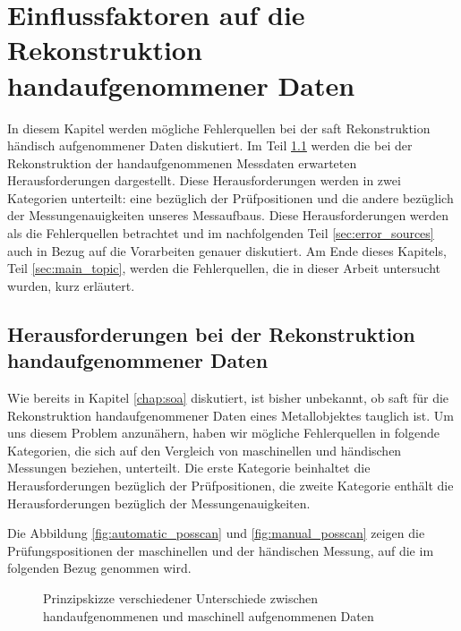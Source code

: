 
\chapter{Einflussfaktoren auf die Rekonstruktion handaufgenommener Daten} \label{chap:errorsource}
In diesem Kapitel werden mögliche Fehlerquellen bei der \acrshort{saft} Rekonstruktion händisch aufgenommener Daten diskutiert. Im Teil \ref{sec:challenges} werden die bei der Rekonstruktion der handaufgenommenen Messdaten erwarteten Herausforderungen dargestellt. Diese Herausforderungen werden in zwei Kategorien unterteilt: eine bezüglich der Prüfpositionen und die andere bezüglich der Messungenauigkeiten unseres Messaufbaus. Diese Herausforderungen werden als die Fehlerquellen betrachtet und im nachfolgenden Teil \ref{sec:error_sources} auch in Bezug auf die Vorarbeiten genauer diskutiert. Am Ende dieses Kapitels, Teil \ref{sec:main_topic}, werden die Fehlerquellen, die in dieser Arbeit untersucht wurden, kurz erläutert.


\section{Herausforderungen bei der Rekonstruktion handaufgenommener Daten} \label{sec:challenges}
Wie bereits in Kapitel \ref{chap:soa} diskutiert, ist bisher unbekannt, ob \acrshort{saft} für die Rekonstruktion handaufgenommener Daten eines Metallobjektes tauglich ist. Um uns diesem Problem anzunähern, haben wir mögliche Fehlerquellen in folgende Kategorien, die sich auf den Vergleich von maschinellen und händischen Messungen beziehen, unterteilt. Die erste Kategorie beinhaltet die Herausforderungen bezüglich der  Prüfpositionen, die zweite Kategorie enthält die Herausforderungen bezüglich der Messungenauigkeiten. \par
Die Abbildung \ref{fig:automatic_posscan} und \ref{fig:manual_posscan} zeigen die Prüfungspositionen der maschinellen und der händischen Messung, auf die im folgenden Bezug genommen wird. 
\begin{figure}[h!]
\begin{center}

\caption[Unterschied zwischen automatischer und händischer Messung]{Prinzipskizze verschiedener Unterschiede zwischen handaufgenommenen und maschinell aufgenommenen Daten}
\label{fig:error_sources}
\end{center}
\end{figure}

